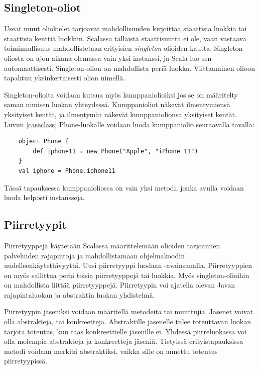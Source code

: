 \subsection{Singleton-oliot} \label{singleton-oliot}
Useat muut oliokielet tarjoavat mahdollisuuden kirjoittaa staattisia luokkia tai staattisia kenttiä luokkiin. Scalassa tälläistä staattisuutta ei ole, vaan vastaava toiminnallisuus mahdollistetaan erityisien \textit{singleton}-olioiden kautta. Singleton-oliosta on ajon aikana olemassa vain yksi instanssi, ja Scala luo sen automaattisesti. Singleton-olion on mahdollista periä luokka. Viittaaminen olioon tapahtuu yksinkertaisesti olion nimellä.
\cite[Singleton objects]{tourOfScala}

Singleton-olioita voidaan kutsua myös kumppaniolioiksi jos se on määritelty saman nimisen luokan yhteydessä. Kumppanioliot näkevät ilmentymiensä yksityiset kentät, ja ilmentymät näkevät kumppaniolionsa yksityiset kentät. Luvun \ref{caseclass} Phone-luokalle voidaan luoda kumppaniolio seuraavalla tavalla:
\begin{lstlisting}
    object Phone {
        def iphone11 = new Phone("Apple", "iPhone 11")
    }
    val iphone = Phone.iphone11
\end{lstlisting}
Tässä tapauksessa kumppanioliossa on vain yksi metodi, jonka avulla voidaan luoda helposti instansseja.
\cite[Luku 4]{prorgrammingInScala3rd}


\subsection{Piirretyypit} \label{piirretyypit}
Piirretyyppejä käytetään Scalassa määrittelemään olioiden tarjoamien palveluiden rajapintoja ja mahdollistamaan ohjelmakoodin uudelleenkäytettävyyttä. Uusi piirretyyppi luodaan -avainsanalla. Piirretyyppien on myös sallittua periä toisia piirretyyppejä tai luokkia. Myös singleton-olioihin on mahdollista liittää piirretyyppejä. Piirretyypin voi ajatella olevan Javan rajapintaluokan ja abstraktin luokan yhdistelmä.
\cite[Luku 6 ja 12]{prorgrammingInScala3rd}

Piirretyypin jäseniksi voidaan määritellä metodeita tai muuttujia. Jäsenet voivat olla abstrakteja, tai konkreetteja. Abstraktille jäsenelle tulee toteuttavan luokan tarjota toteutus, kun taas konkreettielle jäsenille ei. Yhdessä piirreluokassa voi olla molempia abstrakteja ja konkreetteja jäseniä. Tietyissä erityistapauksissa metodi voidaan merkitä abstraktiksi, vaikka sille on annettu toteutus piirretyypissä.
\cite[Luku 10]{scalaForTheImpatient}
